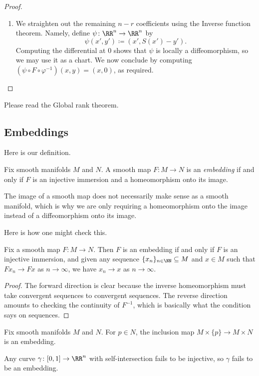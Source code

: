 \documentclass[../notes.tex]{subfiles}
\begin{document}
\begin{proof}
\begin{enumerate}
		\item We straighten out the remaining $n-r$ coefficients using the Inverse function theorem. Namely, define $\psi\colon\RR^n\to\RR^n$ by
		\[\psi(x',y')\coloneqq(x',S(x')-y').\]
		Computing the differential at $0$ shows that $\psi$ is locally a diffeomorphism, so we may use it as a chart. We now conclude by computing $\left(\psi\circ F\circ\varphi^{-1}\right)(x,y)=(x,0)$, as required.
		\qedhere
	\end{enumerate}
\end{proof}
\begin{remark}
	Please read the Global rank theorem.
\end{remark}

\subsection{Embeddings}
Here is our definition.
\begin{definition}[embedding]
	Fix smooth manifolds $M$ and $N$. A smooth map $F\colon M\to N$ is an \textit{embedding} if and only if $F$ is an injective immersion and a homeomorphism onto its image.
\end{definition}
\begin{remark}
	The image of a smooth map does not necessarily make sense as a smooth manifold, which is why we are only requiring a homeomorphism onto the image instead of a diffeomorphism onto its image.
\end{remark}
Here is how one might check this.
\begin{lemma} \label{lem:how-to-embed}
	Fix a smooth map $F\colon M\to N$. Then $F$ is an embedding if and only if $F$ is an injective immersion, and given any sequence $\{x_n\}_{n\in\NN}\subseteq M$ and $x\in M$ such that $Fx_n\to Fx$ as $n\to\infty$, we have $x_n\to x$ as $n\to\infty$.
\end{lemma}
\begin{proof}
	The forward direction is clear because the inverse homeomorphism must take convergent sequences to convergent sequences. The reverse direction amounts to checking the continuity of $F^{-1}$, which is basically what the condition says on sequences.
\end{proof}
\begin{example}
	Fix smooth manifolds $M$ and $N$. For $p\in N$, the inclusion map $M\times\{p\}\to M\times N$ is an embedding.
\end{example}
\begin{nex}
	Any curve $\gamma\colon[0,1]\to\RR^n$ with self-intersection fails to be injective, so $\gamma$ fails to be an embedding.
\end{nex}
\end{document}
